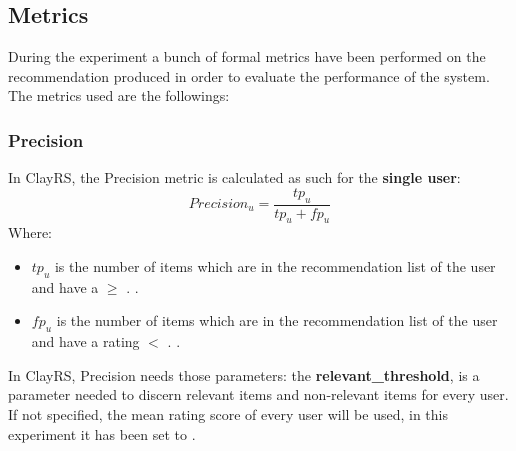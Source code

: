\documentclass[11pt]{article}
\begin{document}
\subsection{Metrics}\label{subsec:metrics}
During the experiment a bunch of formal metrics have been performed on the recommendation produced in order to evaluate
the performance of the system.
The metrics used are the followings:
\hfill\break
\hfill\break

\subsubsection{Precision}\label{subsubsec:precision}
In ClayRS, the Precision metric is calculated as such for the \textbf{single user}:
\hfill\break
\hfill\break
    \[
         Precision_u = \frac{tp_u}{tp_u + fp_u}
    \]
\hfill\break
\hfill\break
    Where:
\begin{itemize}
    \item $tp_u$ is the number of items which are in the recommendation list of the user and have a
       $\geq$ 
        \textbf{}.
        \textbf{}.
    \item $fp_u$ is the number of items which are in the recommendation list of the user and have a
      rating $<$ 
        \textbf{}.
        \textbf{}.
\end{itemize}
\hfill\break
\hfill\break
In ClayRS, Precision needs those parameters:
the \textbf{relevant\_threshold}, is a parameter needed to discern relevant items and non-relevant items for every user.
If not specified, the mean rating score of every user will be used, in this experiment it has been set to
\textbf{}.
\hfill\break
\hfill\break
\end{document}
